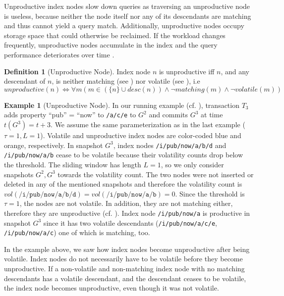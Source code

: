 \documentclass[abstracton,12pt]{scrartcl}
\theoremstyle{definition}
\newtheorem{definition}{Definition}
\newtheorem{example}{Example}
\begin{document}
Unproductive index nodes slow down
queries as traversing an unproductive node is useless, because neither the node
itself nor any of its descendants are matching and thus cannot
yield a query match. Additionally, unproductive nodes occupy storage space that
could otherwise be reclaimed. If the workload changes frequently, unproductive
nodes accumulate in the index and the query performance deteriorates
over time \cite{KW17}.

\begin{definition}[Unproductive Node]
  Index node $n$ is unproductive iff $n$, and any descendant of
  $n$, is neither matching (see ) nor volatile (see
  ), i.e
  $$ unproductive(n) \iff \forall  m (m \in (\{n\} \cup desc(n)) \land
  \neg matching(m) \land \neg volatile(m))$$
  \label{def:unproductive-node}
\end{definition}

\vspace{-0.5cm}

\begin{example}[Unproductive Node]
  In our running example (cf. ), transaction $T_3$ adds
  property ``pub'' = ``now'' to \texttt{/a/c/e} to $G^2$ and commits $G^3$ at time
  $t(G^3) = t+3$. We assume the same parameterization as in the last example
  ($\tau = 1, L = 1$). Volatile and unproductive index nodes are color-coded
  blue and orange, respectively.
  In snapshot $G^3$, index nodes \texttt{/i/pub/now/a/b/d} and
  \texttt{/i/pub/now/a/b} cease to be volatile because their 
  volatility counts drop below the threshold. The sliding window has length $L =
  1$, so we only consider snapshots $G^2,G^3$ towards the volatility count. The two
  nodes were not inserted or deleted in any of the mentioned snapshots and
  therefore the volatility count is $vol(\texttt{/i/pub/now/a/b/d}) =
  vol(\texttt{/i/pub/now/a/b}) = 0$. Since the threshold is $\tau = 1$, the nodes are
  not volatile. In addition,
  they are not matching either, therefore they are unproductive (cf.
  ). Index node
  \texttt{/i/pub/now/a} is productive in snapshot $G^3$ since it has
  two volatile descendants (\texttt{/i/pub/now/a/c/e}, \texttt{/i/pub/now/a/c}) 
  one of which is matching, too.
  \label{ex:unproductive-node}
\end{example}

In the example above, we saw how index nodes become unproductive after being
volatile. Index nodes do not necessarily have to be volatile before they become
unproductive.
If a non-volatile and non-matching index node with no matching descendants has a
volatile descendant, and the descendant ceases to
be volatile, the index node becomes unproductive, even though it was not
volatile.
\end{document}

